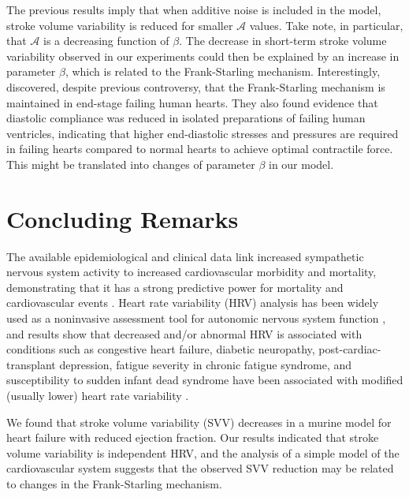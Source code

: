 \documentclass[%
preprint,
 amsmath,amssymb,
 aps,
]{revtex4-2}
\begin{document}
The previous results imply that when additive noise is included in the model, stroke volume variability is reduced for smaller $\mathcal{A}$ values. Take note, in particular, that $\mathcal{A}$ is a decreasing function of $\beta$. The decrease in short-term stroke volume variability observed in our experiments could then be explained by an increase in parameter $\beta$, which is related to the Frank-Starling mechanism. Interestingly, \citet{Holubarsch_1996} discovered, despite previous controversy, that the Frank-Starling mechanism is maintained in end-stage failing human hearts. They also found evidence that diastolic compliance was reduced in isolated preparations of failing human ventricles, indicating that higher end-diastolic stresses and pressures are required in failing hearts compared to normal hearts to achieve optimal contractile force. This might be translated into changes of parameter $\beta$ in our model.

\section{Concluding Remarks}

The available epidemiological and clinical data link increased sympathetic nervous system activity to increased cardiovascular morbidity and mortality, demonstrating that it has a strong predictive power for mortality and cardiovascular events \citep{Malpas_2010}. Heart rate variability (HRV) analysis has been widely used as a noninvasive assessment tool for autonomic nervous system function \citep{Kiyono_2016}, and results show that decreased and/or abnormal HRV is associated with conditions such as congestive heart failure, diabetic neuropathy, post-cardiac-transplant depression, fatigue severity in chronic fatigue syndrome, and susceptibility to sudden infant dead syndrome have been associated with modified (usually lower) heart rate variability \citep{Kamen_1995, Rajendra_Acharya_2006, Zeki_Al_Hazzouri_2014, Escorihuela_2020}. 

We found that stroke volume variability (SVV) decreases in a murine model for heart failure with reduced ejection fraction. Our results indicated that stroke volume variability is independent HRV, and the analysis of a simple model of the cardiovascular system suggests that the observed SVV reduction may be related to changes in the Frank-Starling mechanism.
\end{document}
